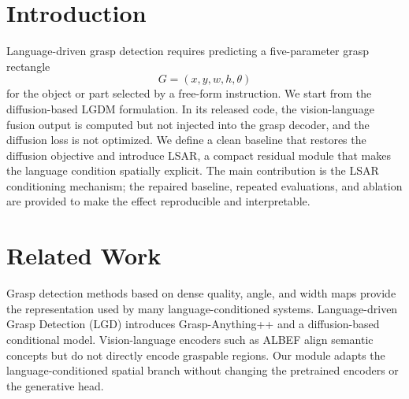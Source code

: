 \section{Introduction}
\label{sec:intro}

Language-driven grasp detection requires predicting a five-parameter grasp
rectangle
\begin{equation}
  G=(x, y, w, h, \theta)
  \label{eq:grasp}
\end{equation}
for the object or part selected by a free-form instruction.  We start from the
diffusion-based LGDM formulation.  In its released code, the vision-language
fusion output is computed but not injected into the grasp decoder, and the
diffusion loss is not optimized.  We define a clean baseline that restores the
diffusion objective and introduce LSAR, a compact residual module that makes
the language condition spatially explicit.  The main contribution is the
LSAR conditioning mechanism; the repaired baseline, repeated evaluations, and
ablation are provided to make the effect reproducible and interpretable.

\section{Related Work}
Grasp detection methods based on dense quality, angle, and width maps
\cite{morrison2018closing,kumra2020grconvnet} provide the representation used
by many language-conditioned systems.  Language-driven Grasp Detection (LGD)
\cite{vuong2024lgd} introduces Grasp-Anything++
\cite{vuong2023graspanything} and a diffusion-based conditional model.
Vision-language encoders such as ALBEF \cite{li2021albef} align semantic
concepts but do not directly encode graspable regions.  Our module adapts the
language-conditioned spatial branch without changing the pretrained encoders
or the generative head.
